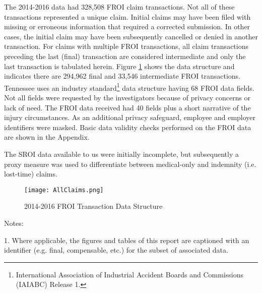 \documentclass[9pt, oneside]{article}   	%
\begin{document}
The 2014-2016 data had 328,508 FROI claim transactions. Not all of these transactions represented a unique claim. Initial claims may have been filed with missing or erroneous information that required a corrected submission. In other cases, the initial claim may have been  subsequently cancelled or denied in another transaction. For claims with multiple FROI transactions, all claim transactions preceding the last (final) transaction are considered intermediate and only the last transaction is tabulated herein. Figure \ref{Fig: AllClaims} shows the data structure and indicates there are 294,962 final and 33,546 intermediate FROI transactions. Tennessee uses an industry standard\footnote{International Association of Industrial Accident Boards and Commissions (IAIABC) Release 1.} data structure having 68 FROI data fields. Not all fields were requested by the investigators because of privacy concerns or lack of need.  The FROI data received had 40 fields plus a short narrative of the injury circumstances. As an additional privacy safeguard, employee and employer identifiers were masked. Basic data validity checks performed on the FROI data are shown in the Appendix. 

The SROI data available to us were initially incomplete, but subsequently a proxy measure was used to differentiate between medical-only and indemnity (i.e. lost-time) claims.




\begin{figure}[h]
\caption{2014-2016 FROI Transaction Data Structure}
\hspace{1.5in}

\label{Fig: AllClaims}
\begin{center}
\texttt{[image: AllClaims.png]}
\end{center}
\end{figure}

    \begin{tablenotes}
      \small
      Notes:\\
      \item 1. Where applicable, the figures and tables of this report are captioned with an identifier (e.g. final, compensable, etc.) for the subset of associated data. \\
    \end{tablenotes}
\end{document}

